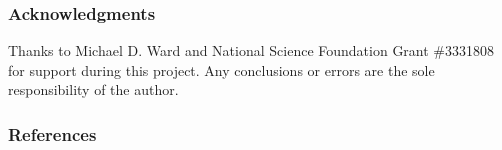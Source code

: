 \documentclass[12pt,letterpaper]{article} %
\begin{document}
\subsubsection*{Acknowledgments}

Thanks to Michael D. Ward and National Science Foundation Grant \#3331808 for support during this project. Any conclusions or errors are the sole responsibility of the author.

\newpage
\subsubsection*{References}



\begingroup
\renewcommand{\section}[2]{}


\endgroup
\end{document}
